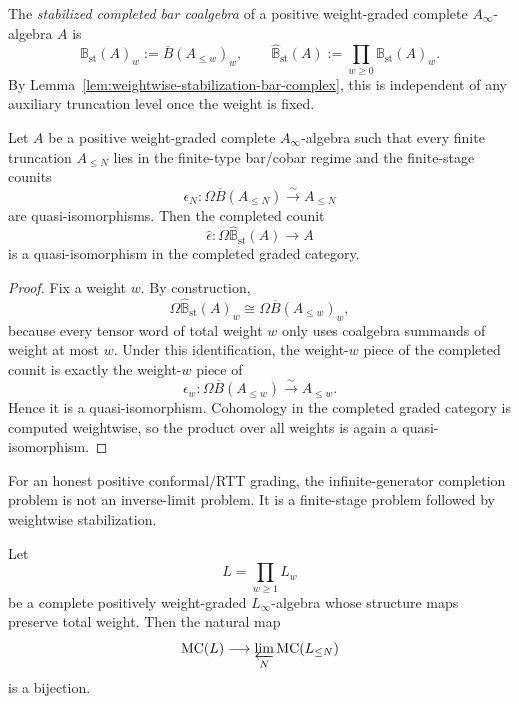 \begin{definition}
\label{def:stabilized-completed-bar-coalgebra}
The \emph{stabilized completed bar coalgebra} of a positive weight-graded
complete $A_\infty$-algebra $A$ is
\[
\mathbb{B}_{\mathrm{st}}(A)_w:=\overline{B}(A_{\le w})_w,
\qquad
\widehat{\mathbb{B}}_{\mathrm{st}}(A):=\prod_{w\ge 0}\mathbb{B}_{\mathrm{st}}(A)_w.
\]
By Lemma~\ref{lem:weightwise-stabilization-bar-complex}, this is independent of
any auxiliary truncation level once the weight is fixed.
\end{definition}

\begin{theorem}
\label{thm:stabilized-completed-recovery}
Let $A$ be a positive weight-graded complete $A_\infty$-algebra such that every
finite truncation $A_{\le N}$ lies in the finite-type bar/cobar regime and the
finite-stage counits
\[
\epsilon_N\colon \Omega\overline{B}(A_{\le N})\xrightarrow{\sim} A_{\le N}
\]
are quasi-isomorphisms.  Then the completed counit
\[
\widehat\epsilon\colon \Omega\widehat{\mathbb{B}}_{\mathrm{st}}(A)
\longrightarrow A
\]
is a quasi-isomorphism in the completed graded category.
\end{theorem}

\begin{proof}
Fix a weight $w$.  By construction,
\[
\Omega\widehat{\mathbb{B}}_{\mathrm{st}}(A)_w
\cong
\Omega\overline{B}(A_{\le w})_w,
\]
because every tensor word of total weight $w$ only uses coalgebra summands of
weight at most $w$.  Under this identification, the weight-$w$ piece of the
completed counit is exactly the weight-$w$ piece of
\[
\epsilon_w\colon \Omega\overline{B}(A_{\le w})\xrightarrow{\sim} A_{\le w}.
\]
Hence it is a quasi-isomorphism.  Cohomology in the completed graded category is
computed weightwise, so the product over all weights is again a
quasi-isomorphism.
\end{proof}

\begin{corollary}
\label{cor:automatic-tower-convergence-positive-degree}
For an honest positive conformal/RTT grading, the infinite-generator completion
problem is not an inverse-limit problem.  It is a finite-stage problem followed
by weightwise stabilization.
\end{corollary}

\begin{theorem}
\label{thm:weightwise-maurer-cartan-descent}
Let
\[
L=\prod_{w\ge 1}L_w
\]
be a complete positively weight-graded $L_\infty$-algebra whose structure maps
preserve total weight.  Then the natural map
\[
\operatorname{MC}(L)\longrightarrow \varprojlim_N \operatorname{MC}(L_{\le N})
\]
is a bijection.
\end{theorem}

